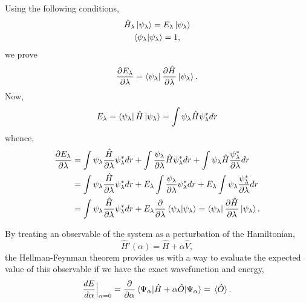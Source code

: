 \begin{tcolorbox}[width=\textwidth,colback={white},title={Proof of the Hellmann-Feynman theorem},colbacktitle=pink,coltitle=black]
    Using the following conditions,
    \begin{gather}
        \hat{H}_\lambda \ket{\psi_\lambda} = E_\lambda \ket{\psi_\lambda} \\
        \braket{\psi_\lambda} = 1,
    \end{gather}
    we prove 
    \begin{equation}
        \frac{\partial E_\lambda}{\partial \lambda} 
            = \bra{\psi_\lambda} \frac{\partial \hat{H}}{\partial \lambda} \ket{\psi_\lambda}.
    \end{equation}
    Now,
    \begin{equation}
        E_\lambda =  \bra{\psi_\lambda} \hat{H} \ket{\psi_\lambda}
        = \int \psi_\lambda \hat{H} \psi^*_\lambda dr
    \end{equation}
    whence,
    \begin{equation}
        \begin{aligned}
        \frac{\partial E_\lambda}{\partial \lambda}
        &= \int \psi_\lambda \frac{\hat{H}}{\partial\lambda} \psi^*_\lambda dr
        + \int \frac{\psi_\lambda}{\partial\lambda} \hat{H} \psi^*_\lambda dr
        + \int \psi_\lambda \hat{H} \frac{\psi^*_\lambda}{\partial\lambda} dr \\
        &= \int \psi_\lambda \frac{\hat{H}}{\partial\lambda} \psi^*_\lambda dr
        + E_\lambda \int \frac{\psi_\lambda}{\partial\lambda}  \psi^*_\lambda dr
        + E_\lambda \int \psi_\lambda \frac{\psi^*_\lambda}{\partial\lambda} dr \\
        &= \int \psi_\lambda \frac{\hat{H}}{\partial\lambda} \psi^*_\lambda dr
        + E_\lambda \frac{\partial }{\partial \lambda} \braket{\psi_\lambda}
        = \bra{\psi_\lambda} \frac{\partial \hat{H}}{\partial \lambda} \ket{\psi_\lambda}.
        \end{aligned}
    \end{equation}
\end{tcolorbox}

By treating an observable of the system as a perturbation of the Hamiltonian,
\begin{equation*}
    \hat{H}'(\alpha) = \hat{H} + \alpha\hat{V},
\end{equation*}
the Hellman-Feynman theorem provides us with a way to evaluate the expected value of 
this observable if we have the exact wavefunction and energy,
\begin{equation}
    \frac{d E}{d\alpha}\Big\lvert_{\alpha=0}
    = \frac{\partial}{\partial \alpha} 
        \mel{\Psi_\alpha}{\hat{H} + \alpha\hat{O}}{\Psi_\alpha}
    = \ev*{\hat{O}}.
\end{equation}

